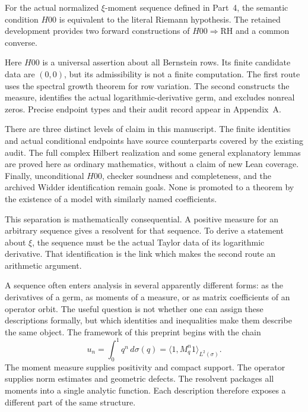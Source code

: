 \begin{theorem}\label{intro:actual}
For the actual normalized $\xi$-moment sequence defined in Part~4,
the semantic condition $H00$ is equivalent to the literal Riemann
hypothesis. The retained development provides two forward
constructions of $H00\Rightarrow\mathrm{RH}$ and a common converse.
\end{theorem}
Here $H00$ is a universal assertion about all Bernstein rows. Its
finite candidate data are $(0,0)$, but its admissibility is not a
finite computation. The first route uses the spectral growth theorem
for row variation. The second constructs the measure, identifies the
actual logarithmic-derivative germ, and excludes nonreal zeros.
Precise endpoint types and their audit record appear in Appendix~A.

There are three distinct levels of claim in this manuscript.
The finite identities and actual conditional endpoints have source
counterparts covered by the existing audit. The full complex Hilbert
realization and some general explanatory lemmas are proved here as
ordinary mathematics, without a claim of new Lean coverage. Finally,
unconditional $H00$, checker soundness and completeness, and the
archived Widder identification remain goals. None is promoted to a
theorem by the existence of a model with similarly named coefficients.

This separation is mathematically consequential. A positive measure
for an arbitrary sequence gives a resolvent for that sequence. To
derive a statement about $\xi$, the sequence must be the actual Taylor
data of its logarithmic derivative. That identification is the link
which makes the second route an arithmetic argument.

A sequence often enters analysis in several apparently different
forms: as the derivatives of a germ, as moments of a measure, or as
matrix coefficients of an operator orbit. The useful question is not
whether one can assign these descriptions formally, but which
identities and inequalities make them describe the same object.
The framework of this preprint begins with the chain
\[
 u_n=\int_0^1 q^n\,d\sigma(q)
     =\langle 1,M_q^n1\rangle_{L^2(\sigma)}.
\]
The moment measure supplies positivity and compact support. The
operator supplies norm estimates and geometric defects. The resolvent
packages all moments into a single analytic function. Each description
therefore exposes a different part of the same structure.

